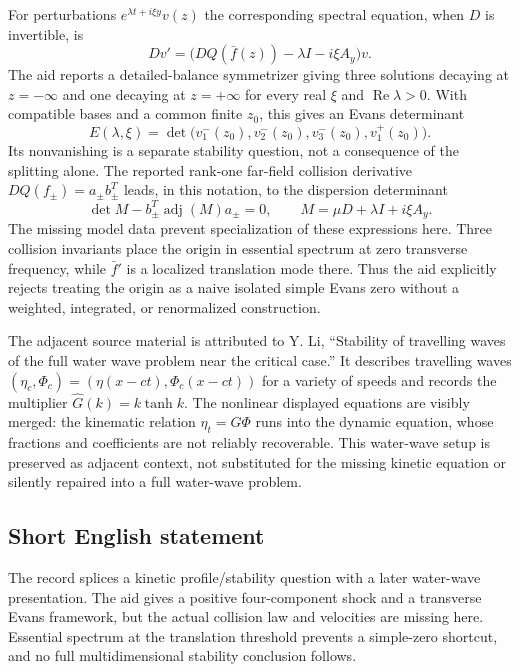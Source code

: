 \documentclass[11pt]{article}
\begin{document}
For perturbations $e^{\lambda t+i\xi y}v(z)$ the corresponding spectral equation, when $D$ is invertible, is
\[
D v'=\bigl(DQ(\bar f(z))-\lambda I-i\xi A_y\bigr)v.
\]
The aid reports a detailed-balance symmetrizer giving three solutions decaying at $z=-\infty$ and one decaying at $z=+\infty$ for every real $\xi$ and $\operatorname{Re}\lambda>0$. With compatible bases and a common finite $z_0$, this gives an Evans determinant
\[
E(\lambda,\xi)=\det\bigl(v^-_1(z_0),v^-_2(z_0),v^-_3(z_0),v^+_1(z_0)\bigr).
\]
Its nonvanishing is a separate stability question, not a consequence of the splitting alone. The reported rank-one far-field collision derivative $DQ(f_\pm)=a_\pm b_\pm^T$ leads, in this notation, to the dispersion determinant
\[
\det M-b_\pm^T\operatorname{adj}(M)a_\pm=0,
\qquad M=\mu D+\lambda I+i\xi A_y.
\]
The missing model data prevent specialization of these expressions here. Three collision invariants place the origin in essential spectrum at zero transverse frequency, while $\bar f'$ is a localized translation mode there. Thus the aid explicitly rejects treating the origin as a naive isolated simple Evans zero without a weighted, integrated, or renormalized construction.

The adjacent source material is attributed to Y. Li, ``Stability of travelling waves of the full water wave problem near the critical case.'' It describes travelling waves $(\eta_c,\Phi_c)=(\eta(x-ct),\Phi_c(x-ct))$ for a variety of speeds and records the multiplier $\widehat G(k)=k\tanh k$. The nonlinear displayed equations are visibly merged: the kinematic relation $\eta_t=G\Phi$ runs into the dynamic equation, whose fractions and coefficients are not reliably recoverable. This water-wave setup is preserved as adjacent context, not substituted for the missing kinetic equation or silently repaired into a full water-wave problem.
\subsection{Short English statement}
The record splices a kinetic profile/stability question with a later water-wave presentation. The aid gives a positive four-component shock and a transverse Evans framework, but the actual collision law and velocities are missing here. Essential spectrum at the translation threshold prevents a simple-zero shortcut, and no full multidimensional stability conclusion follows.
\end{document}
